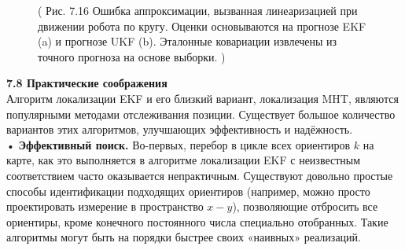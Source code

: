 \documentclass[10pt,a4paper]{article}
\begin{document}
\begin{figure}[H]
	\caption{ ( Рис. 7.16 Ошибка аппроксимации, вызванная линеаризацией при движении робота по кругу. Оценки основываются на прогнозе EKF (a) и прогнозе UKF (b). Эталонные ковариации извлечены из точного прогноза на основе выборки. )}
	\label{fig:716orig}
\end{figure}

\textbf{7.8 Практические соображения}\\

Алгоритм локализации EKF и его близкий вариант, локализация MHT, являются популярными методами отслеживания позиции. Существует большое количество вариантов этих алгоритмов, улучшающих эффективность и надёжность. \\

•\textbf{ Эффективный поиск.} Во-первых,  перебор в цикле всех ориентиров $k$ на карте, как это выполняется в алгоритме локализации EKF с неизвестным соответствием часто оказывается непрактичным. Существуют довольно простые способы идентификации подходящих ориентиров (например, можно просто проектировать измерение в пространство $x-y$), позволяющие отбросить все ориентиры, кроме конечного постоянного числа специально отобранных.
Такие алгоритмы могут быть на порядки быстрее своих «наивных» реализаций.\\
\end{document}
